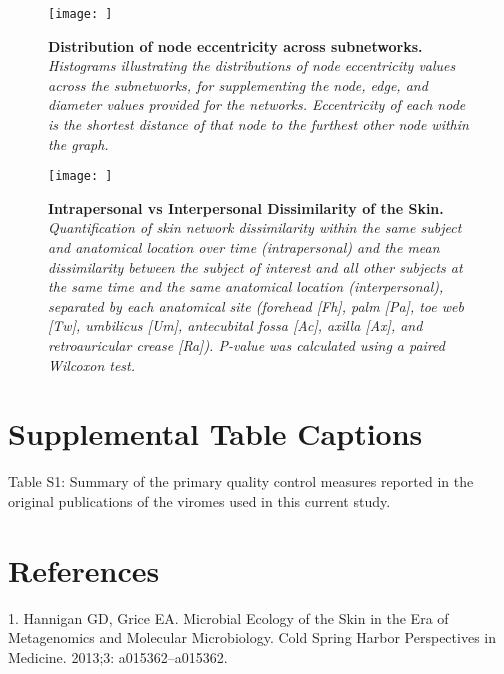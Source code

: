 \documentclass[12pt,]{article}
\begin{document}
\newpage

\begin{figure}[htbp]
\centering
\texttt{[image: ]}
\caption{\textbf{Distribution of node eccentricity across subnetworks.}
\emph{Histograms illustrating the distributions of node eccentricity
values across the subnetworks, for supplementing the node, edge, and
diameter values provided for the networks. Eccentricity of each node is
the shortest distance of that node to the furthest other node within the
graph.}\label{eccplot}}
\end{figure}

\newpage

\begin{figure}[htbp]
\centering
\texttt{[image: ]}
\caption{\textbf{Intrapersonal vs Interpersonal Dissimilarity of the
Skin.} \emph{Quantification of skin network dissimilarity within the
same subject and anatomical location over time (intrapersonal) and the
mean dissimilarity between the subject of interest and all other
subjects at the same time and the same anatomical location
(interpersonal), separated by each anatomical site (forehead {[}Fh{]},
palm {[}Pa{]}, toe web {[}Tw{]}, umbilicus {[}Um{]}, antecubital fossa
{[}Ac{]}, axilla {[}Ax{]}, and retroauricular crease {[}Ra{]}). P-value
was calculated using a paired Wilcoxon test.}\label{allskin}}
\end{figure}

\newpage

\section{Supplemental Table Captions}\label{supplemental-table-captions}

Table S1: Summary of the primary quality control measures reported in
the original publications of the viromes used in this current study.

\newpage

\section*{References}\label{references}

\hypertarget{refs}{}
\hypertarget{ref-Hannigan:2013im}{}
1. Hannigan GD, Grice EA. Microbial Ecology of the Skin in the Era of
Metagenomics and Molecular Microbiology. Cold Spring Harbor Perspectives
in Medicine. 2013;3: a015362--a015362.
\end{document}
